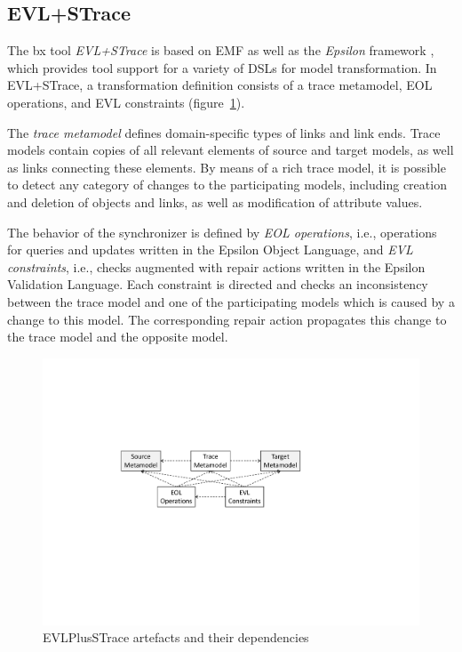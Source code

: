 \subsection{EVL+STrace}
\label{sec:EVLPlusSTrace}

The bx tool \emph{EVL+STrace} \cite{IST2018-Samimi} is based on EMF as well as the \emph{Epsilon} framework \cite{epsilon}, which provides tool support for a variety of DSLs for model transformation.
In EVL+STrace, a transformation definition consists of a trace metamodel, EOL operations, and EVL constraints (figure~\ref{fig:evlartefacts}).

The \emph{trace metamodel} defines domain-specific types of links and link ends.
Trace models contain copies of all relevant elements of source and target models, as well as links connecting these elements.
By means of a rich trace model, it is possible to detect any category of changes to the participating models, including creation and deletion of objects and links, as well as modification of attribute values.

The behavior of the synchronizer is defined by \emph{EOL operations}, i.e., operations for queries and updates written in the Epsilon Object Language, and \emph{EVL constraints}, i.e., checks augmented with repair actions written in the Epsilon Validation Language.
Each constraint is directed and checks an inconsistency between the trace model and one of the participating models which is caused by a change to this model.
The corresponding repair action propagates this change to the trace model and the opposite model.

\begin{figure}[tb!]
	\centering
	\includegraphics[width=0.8\columnwidth]{diagrams/solutions/EVLPlusSTraceArtefacts}
	\caption{EVLPlusSTrace artefacts and their dependencies}
	\label{fig:evlartefacts}
\end{figure}

